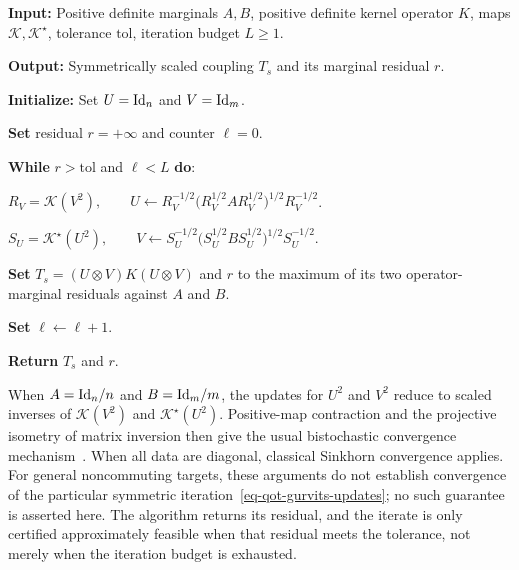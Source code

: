 \begin{alg}\label{alg:quantum-gurvits-scaling}
\textbf{Input:} Positive definite marginals $A,B$, positive definite kernel operator $K$, maps $\mathcal K,\mathcal K^\star$, tolerance $\mathrm{tol}$, iteration budget $L\geq1$.

\textbf{Output:} Symmetrically scaled coupling $T_s$ and its marginal residual $r$.

\textbf{Initialize:} Set $U=\mathrm{Id}_n$ and $V=\mathrm{Id}_m$.

\textbf{Set} residual \(r=+\infty\) and counter $\ell=0$.

\textbf{While} \(r>\mathrm{tol}\) and $\ell<L$ \textbf{do}:
\begin{algblock}
\(R_V=\mathcal K(V^2), \qquad U\leftarrow R_V^{-1/2}\bigl(R_V^{1/2} A R_V^{1/2}\bigr)^{1/2}R_V^{-1/2}\).

\(S_U=\mathcal K^\star(U^2), \qquad V\leftarrow S_U^{-1/2}\bigl(S_U^{1/2} B S_U^{1/2}\bigr)^{1/2}S_U^{-1/2}\).

\textbf{Set} \(T_s=(U\otimes V)K(U\otimes V)\) and \(r\) to the maximum of its two operator-marginal residuals against $A$ and $B$.

\textbf{Set} $\ell\leftarrow \ell+1$.
\end{algblock}
\algreturnskip
\textbf{Return} \(T_s\) and $r$.
\end{alg}
When $A=\mathrm{Id}_n/n$ and $B=\mathrm{Id}_m/m$, the updates for $U^2$ and $V^2$ reduce to scaled inverses of $\mathcal K(V^2)$ and $\mathcal K^\star(U^2)$. Positive-map contraction and the projective isometry of matrix inversion then give the usual bistochastic convergence mechanism~\cite{georgiou2015positive,garg2018recent}. When all data are diagonal, classical Sinkhorn convergence applies. For general noncommuting targets, these arguments do not establish convergence of the particular symmetric iteration~\eqref{eq-qot-gurvits-updates}; no such guarantee is asserted here. The algorithm returns its residual, and the iterate is only certified approximately feasible when that residual meets the tolerance, not merely when the iteration budget is exhausted.


